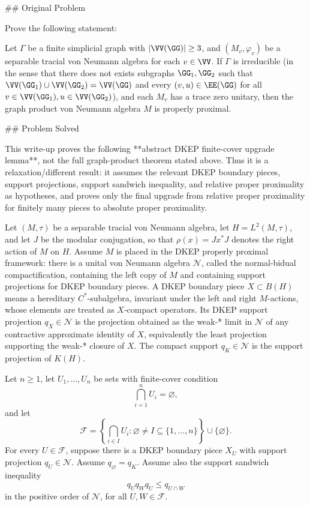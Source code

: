 ## Original Problem

Prove the following statement:

Let $\Gamma$ be a finite simplicial graph with $|\VV(\GG)|\geq 3$, and $(M_v,\varphi_v)$ be a separable tracial von Neumann algebra for each $v\in \VV$. If $\Gamma$ is irreducible (in the sense that there does not exists subgraphs $\GG_1,\GG_2$ such that $ \VV(\GG_1)\cup \VV(\GG_2)=\VV(\GG) $ and every $(v,u)\in \EE(\GG) $ for all $v\in\VV(\GG_1),u\in \VV(\GG_2)$), and each $M_v$ has a trace zero unitary, then the graph product von Neumann algebra $M$ is properly proximal.

## Problem Solved

This write-up proves the following **abstract DKEP finite-cover upgrade lemma**, not the full graph-product theorem stated above. Thus it is a relaxation/different result: it assumes the relevant DKEP boundary pieces, support projections, support sandwich inequality, and relative proper proximality as hypotheses, and proves only the final upgrade from relative proper proximality for finitely many pieces to absolute proper proximality.

Let \((M,\tau)\) be a separable tracial von Neumann algebra, let \(H=L^2(M,\tau)\), and let \(J\) be the modular conjugation, so that \(\rho(x)=Jx^*J\) denotes the right action of \(M\) on \(H\). Assume \(M\) is placed in the DKEP properly proximal framework: there is a unital von Neumann algebra \(\mathcal N\), called the normal-bidual compactification, containing the left copy of \(M\) and containing support projections for DKEP boundary pieces. A DKEP boundary piece \(X\subset B(H)\) means a hereditary \(C^*\)-subalgebra, invariant under the left and right \(M\)-actions, whose elements are treated as \(X\)-compact operators. Its DKEP support projection \(q_X\in\mathcal N\) is the projection obtained as the weak-* limit in \(\mathcal N\) of any contractive approximate identity of \(X\), equivalently the least projection supporting the weak-* closure of \(X\). The compact support \(q_K\in\mathcal N\) is the support projection of \(K(H)\).

Let \(n\ge 1\), let \(U_1,\dots,U_n\) be sets with finite-cover condition
\[
\bigcap_{i=1}^n U_i=\varnothing,
\]
and let
\[
\mathcal F=\left\{\bigcap_{i\in I}U_i:\varnothing\ne I\subseteq\{1,\dots,n\}\right\}\cup\{\varnothing\}.
\]
For every \(U\in\mathcal F\), suppose there is a DKEP boundary piece \(X_U\) with support projection \(q_U\in\mathcal N\). Assume \(q_{\varnothing}=q_K\). Assume also the support sandwich inequality
\[
q_Uq_Wq_U\le q_{U\cap W}
\]
in the positive order of \(\mathcal N\), for all \(U,W\in\mathcal F\).

